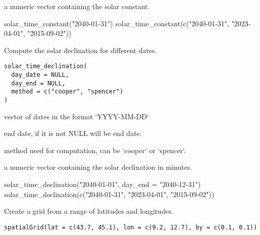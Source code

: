 \documentclass[a4paper]{book}
\begin{document}
%
\begin{Value}
a numeric vector containing the solar constant.
\end{Value}
%
\begin{Examples}
\begin{ExampleCode}
solar_time_constant("2040-01-31")
solar_time_constant(c("2040-01-31", "2023-04-01", "2015-09-02"))
\end{ExampleCode}
\end{Examples}
%
\begin{Description}\relax
Compute the solar declination for different dates.
\end{Description}
%
\begin{Usage}
\begin{verbatim}
solar_time_declination(
  day_date = NULL,
  day_end = NULL,
  method = c("cooper", "spencer")
)
\end{verbatim}
\end{Usage}
%
\begin{Arguments}
\begin{ldescription}
\item[\code{day\_date}] vector of dates in the format `YYYY-MM-DD`

\item[\code{day\_end}] end date, if it is not NULL will be end date.

\item[\code{method}] method used for computation, can be `cooper` or `spencer`.
\end{ldescription}
\end{Arguments}
%
\begin{Value}
a numeric vector containing the solar declination in minutes.
\end{Value}
%
\begin{Examples}
\begin{ExampleCode}
solar_time_declination("2040-01-01", day_end = "2040-12-31")
solar_time_declination(c("2040-01-31", "2023-04-01", "2015-09-02"))
\end{ExampleCode}
\end{Examples}
%
\begin{Description}\relax
Create a grid from a range of latitudes and longitudes.
\end{Description}
%
\begin{Usage}
\begin{verbatim}
spatialGrid(lat = c(43.7, 45.1), lon = c(9.2, 12.7), by = c(0.1, 0.1))
\end{verbatim}
\end{Usage}
\end{document}
